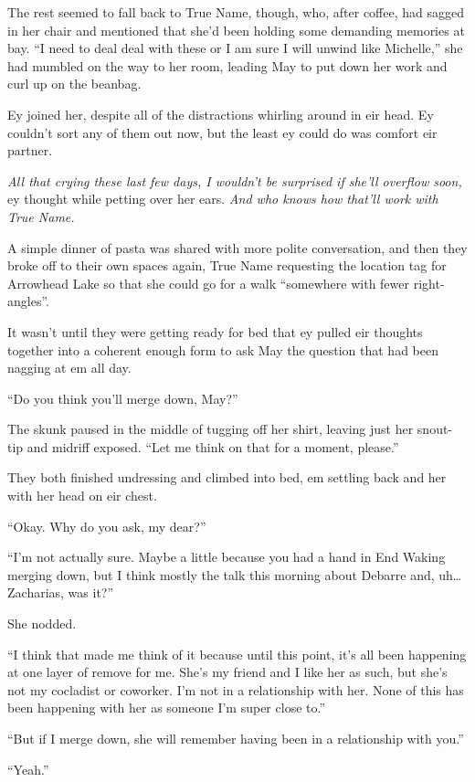 The rest seemed to fall back to True Name, though, who, after coffee, had sagged in her chair and mentioned that she'd been holding some demanding memories at bay. ``I need to deal deal with these or I am sure I will unwind like Michelle,'' she had mumbled on the way to her room, leading May to put down her work and curl up on the beanbag.

Ey joined her, despite all of the distractions whirling around in eir head. Ey couldn't sort any of them out now, but the least ey could do was comfort eir partner.

\emph{All that crying these last few days, I wouldn't be surprised if she'll overflow soon,} ey thought while petting over her ears. \emph{And who knows how that'll work with True Name.}

A simple dinner of pasta was shared with more polite conversation, and then they broke off to their own spaces again, True Name requesting the location tag for Arrowhead Lake so that she could go for a walk ``somewhere with fewer right-angles''.

It wasn't until they were getting ready for bed that ey pulled eir thoughts together into a coherent enough form to ask May the question that had been nagging at em all day.

``Do you think you'll merge down, May?''

The skunk paused in the middle of tugging off her shirt, leaving just her snout-tip and midriff exposed. ``Let me think on that for a moment, please.''

They both finished undressing and climbed into bed, em settling back and her with her head on eir chest.

``Okay. Why do you ask, my dear?''

``I'm not actually sure. Maybe a little because you had a hand in End Waking merging down, but I think mostly the talk this morning about Debarre and, uh\ldots Zacharias, was it?''

She nodded.

``I think that made me think of it because until this point, it's all been happening at one layer of remove for me. She's my friend and I like her as such, but she's not my cocladist or coworker. I'm not in a relationship with her. None of this has been happening with her as someone I'm super close to.''

``But if I merge down, she will remember having been in a relationship with you.''

``Yeah.''

